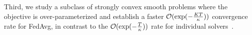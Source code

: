 Third, we study a subclass of strongly convex smooth problems where the objective is over-parameterized and establish 
a faster ${\mathcal{O}}(\exp(-\frac{KT}{\kappa}))$ convergence rate for FedAvg, in contrast to the ${\mathcal{O}}(\exp(-\frac{T}{\kappa}))$ rate for individual solvers~\cite{ma2017power}. 
\begin{comment}
Within this class, we further consider the linear regression problem and establish an even sharper rate under FedAvg. In addition, we propose a new variant of accelerated FedAvg based on a momentum update of~\cite{liu2018accelerating}--MaSS accelerated FedAvg--and establish a faster convergence rate (compared to if no acceleration is used). This stands in contrast to generic (strongly) convex stochastic problems where theoretically no rate improvement is obtained when one accelerates FedAvg.
The detailed convergence results are summarized in Table~\ref{tb:convergencerateintro}.
\end{comment}

